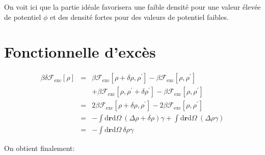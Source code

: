 On voit ici que la partie idéale favorisera une faible densité pour une valeur élevée de potentiel $\phi$ et des densité fortes pour des valeurs de potentiel faibles.

\section{Fonctionnelle d'excès}
\label{sec:annexes:grad:exc}



\begin{eqnarray}
\beta \delta \mathcal{F}_\mathrm{exc}[\rho] &=& \beta \mathcal{F}_\mathrm{exc}[\rho + \delta \rho, \rho^\prime] -\beta \mathcal{F}_\mathrm{exc}[\rho, \rho^\prime] \\
& & + \beta \mathcal{F}_\mathrm{exc}[\rho, \rho^\prime + \delta \rho^\prime] -\beta \mathcal{F}_\mathrm{exc}[\rho, \rho^\prime] \nonumber\\
&=& 2 \beta \mathcal{F}_\mathrm{exc}[\rho + \delta \rho, \rho^\prime] - 2 \beta \mathcal{F}_\mathrm{exc}[\rho, \rho^\prime] \\
&=& -\int\mathrm{d}\boldsymbol{r}\mathrm{d}\Omega\ ( \Delta\rho+\delta\rho) \gamma  + \int\mathrm{d}\boldsymbol{r}\mathrm{d}\Omega\ ( \Delta\rho \gamma ) \\
&=& -\int\mathrm{d}\boldsymbol{r}\mathrm{d}\Omega\ \delta\rho \gamma
\end{eqnarray}

On obtient finalement:

